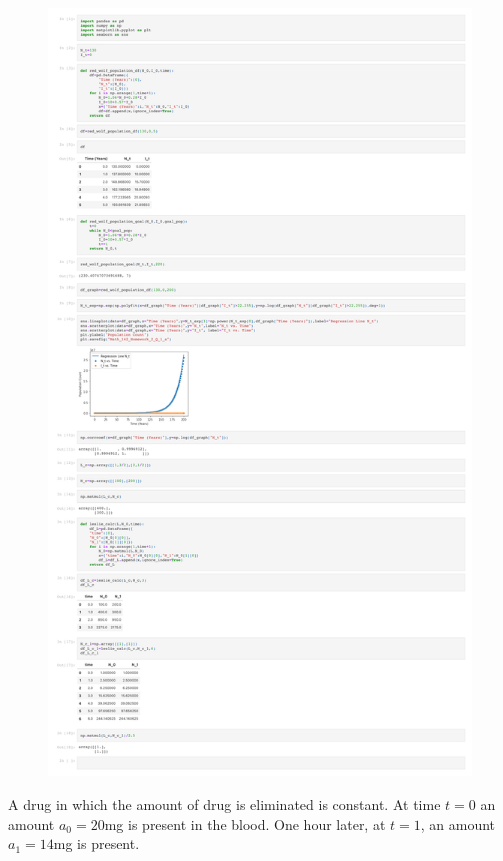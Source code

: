 \documentclass[addpoints, 11pt]{exam}
\begin{document}
\begin{questions}
\begin{parts}
\begin{figure}[H]
	\includegraphics[scale=0.3]{Math_142_Homework_2_Q_1.pdf}
\end{figure}
\end{parts}
\question A drug in which the amount of drug is eliminated is constant. At time $t=0$ an amount $a_0=20$mg is present in the blood. One hour later, at $t=1$, an amount $a_1=14$mg is present.
\begin{parts}

\end{parts}
\end{questions}
\end{document}
